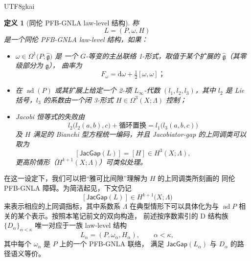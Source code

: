 \documentclass[12pt]{article}
\newtheorem{definition}{定义}[section]
\newcommand{\JacGap}{\mathsf{JacGap}}
\begin{document}
\begin{CJK*}{UTF8}{gkai}
\begin{definition}[同伦 PFB-GNLA law-level 结构]
称
\[
  L=(P,\omega,H)
\]
是一个同伦 PFB-GNLA law-level 结构，如果：
  \begin{itemize}
    \item $\omega\in\Omega^1\bigl(P;\widehat{\mathfrak g}\bigr)$ 是
          一个 $G$-等变的主丛联络 1-形式，取值于某个扩展的
          $\widehat{\mathfrak g}$（其零级部分为 $\mathfrak g$），
          曲率为
          \[
            F_\omega
            =
            \mathrm{d}\omega
            + \tfrac{1}{2}[\omega,\omega]；
          \]
    \item 在 $\operatorname{ad}(P)$ 或其扩展上给定一个 2-项
          $L_\infty$-代数 $(l_1,l_2,l_3)$，其中 $l_2$ 是
          Lie 括号，$l_3$ 的系数由一个闭 3-形式
          $H\in\Omega^3(X;\Lambda)$ 控制；
    \item Jacobi 恒等式的失败由
          \[
            l_2\bigl(l_2(a,b),c\bigr)+\text{循环置换}
            =
            l_1\bigl(l_3(a,b,c)\bigr)
          \]
          及 $H$ 满足的 Bianchi 型方程统一编码，并且 Jacobiator-gap
          的上同调类可以取为
          \[
            [\JacGap(L)]
            =
            [H]\in H^3(X;\Lambda),
          \]
          更高阶情形（$H^{k+1}(X;\Lambda)$）可类似处理。
  \end{itemize}
\end{definition}

在这一设定下，我们可以把“雅可比间隙”理解为 $H$ 的上同调类所刻画的
同伦 PFB-GNLA 障碍。为简洁起见，下文仍记
\[
  [\JacGap(L)]\in H^{k+1}\bigl(X;\Lambda\bigr)
\]
来表示相应的上同调指标，其中系数系 $\Lambda$ 在典型情形下可以具体化为与
$\operatorname{ad}P$ 相关的某个表示。按照本笔记前文的双向构造，
前述按序数索引的 D 结构族
$\{D_\alpha\}_{\alpha<\kappa}$ 唯一对应于一族 law-level 结构
\[
  L_\alpha=(P,\omega_\alpha,H_\alpha),\qquad \alpha<\kappa,
\]
其中每个 $\omega_\alpha$ 是 $P$ 上的一个 PFB-GNLA 联络，
满足 $\JacGap(L_\alpha)$ 与 $D_\alpha$ 的路径语义等价。


\end{CJK*}
\end{document}
